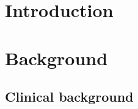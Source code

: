 \documentclass[a4paper,12pt,twoside]{report}
\author{\me}
\begin{document}


\normalsize

\clearemptydoublepage

\linenumbers

%



\tableofcontents

\clearemptydoublepage

\listoffigures

\clearemptydoublepage

\listoftables

\clearemptydoublepage
\printnomenclature
\clearemptydoublepage



\setcounter{page}{0}
%


\clearemptydoublepage


\part{Introduction}\label{chapter:introduction}

\clearemptydoublepage
\part{Background}\label{part:background}
\chapter{ Clinical background}\label{chapter:clinicalbachground}

\end{document}
